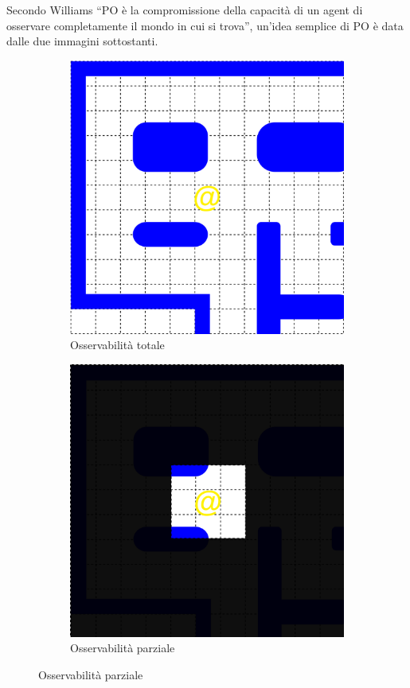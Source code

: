 \documentclass[8pt]{book}
\begin{document}
Secondo Williams \cite{Williams} ``PO è la compromissione della capacità di un agent di osservare completamente il mondo in cui si trova'', un'idea semplice di PO è data dalle due immagini sottostanti.

\begin{figure}[H]
\centering
  
  \begin{subfigure}[b]{0.49\textwidth}
    \includegraphics[width=\textwidth]{img/po_2.png}
    \caption{Osservabilità totale}
    \label{to}
   \end{subfigure}
  \begin{subfigure}[b]{0.49\textwidth}
    \includegraphics[width=\textwidth]{img/po_1.png}
    \caption{Osservabilità parziale}
    \label{po}
  \end{subfigure}


\end{figure}
\end{document}
